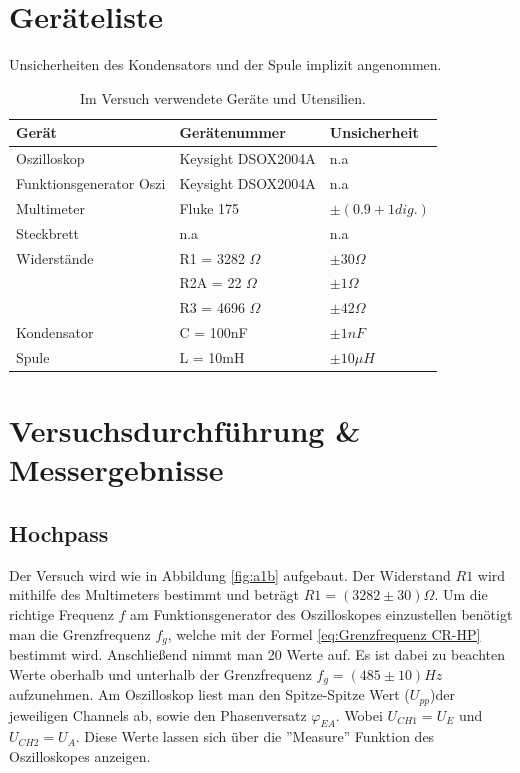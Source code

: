 \documentclass[12pt,a4paper,twoside]{article}
\begin{document}
\section{Geräteliste} %
Unsicherheiten des Kondensators und der Spule implizit angenommen. 
    \begin{table}[H]
        \centering
        \caption{Im Versuch verwendete Geräte und Utensilien.}
        \label{tab:geraete}
        \begin{tabular}{| l | l | l |}
            \hline
            Gerät    & Gerätenummer  & Unsicherheit \\
            \hline
            Oszilloskop             & Keysight DSOX2004A        & {n.a} \\
            Funktionsgenerator Oszi & Keysight DSOX2004A        & {n.a} \\
            Multimeter              & Fluke 175                 & $\pm (0.9 + 1 dig.)$ \cite{fluke} \\
            Steckbrett              & {n.a}                     & {n.a} \\
            Widerstände             & R1 = 3282 $\Omega$        & $\pm 30 \Omega$ \\
                                    & R2A = 22 $\Omega$         & $\pm 1 \Omega$ \\
                                    & R3 = 4696 $\Omega$        & $\pm 42 \Omega$ \\
            Kondensator             & C = 100nF                 & $\pm 1 nF$ \\
            Spule                   & L = 10mH                  & $\pm 10 \mu H$ \\
            \hline
        \end{tabular}
    \end{table}


\section{Versuchsdurchführung \& Messergebnisse} %
\subsection{Hochpass}
Der Versuch wird wie in Abbildung \ref{fig:a1b} aufgebaut. 
Der Widerstand $R1$ wird mithilfe des Multimeters bestimmt und beträgt $R1 = (3282 \pm 30)\Omega $. 
Um die richtige Frequenz $f$ am Funktionsgenerator des Oszilloskopes einzustellen benötigt man die Grenzfrequenz $f_g$, welche mit der Formel \ref{eq:Grenzfrequenz CR-HP} bestimmt wird. 
Anschließend nimmt man 20 Werte auf. Es ist dabei zu beachten Werte oberhalb und unterhalb der Grenzfrequenz $f_g = (485 \pm 10)Hz $ aufzunehmen. 
Am Oszilloskop liest man den Spitze-Spitze Wert ($U_{pp}$)der jeweiligen Channels ab, sowie den Phasenversatz $\varphi_{EA}$. Wobei $U_{CH1} = U_E$ und $U_{CH2} = U_A$. 
Diese Werte lassen sich über die ''Measure'' Funktion des Oszilloskopes anzeigen. 
\end{document}

